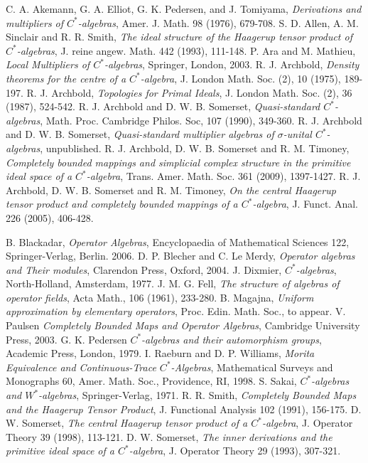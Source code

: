 \documentclass[]{amsart}
\theoremstyle{remark}
\theoremstyle{definition}
\theoremstyle{question}
\numberwithin{equation}{section}
\begin{document}
\begin{thebibliography}{99}

 C. A. Akemann, G. A. Elliot, G. K. Pedersen, and J. Tomiyama,
\emph{Derivations and multipliers of $C^*$-algebras}, Amer. J. Math. 98
 (1976), 679-708.
 S. D. Allen, A. M. Sinclair and R. R. Smith, \emph{The ideal
structure of the Haagerup tensor product of $C^*$-algebras}, J. reine angew.
Math. 442 (1993), 111-148.
 P. Ara and M. Mathieu, \emph{Local Multipliers of $C^*$-algebras},
Springer, London, 2003.
 R. J. Archbold, \emph{Density theorems for the centre of a
$C^*$-algebra}, J. London Math. Soc. (2), 10 (1975), 189-197.
 R. J. Archbold, \emph{Topologies for Primal Ideals}, J. London
Math. Soc. (2), 36 (1987), 524-542.
 R. J. Archbold and D. W. B. Somerset, \emph{Quasi-standard
$C^*$-algebras}, Math. Proc. Cambridge Philos. Soc, 107 (1990), 349-360.
 R. J. Archbold and D. W. B. Somerset, \emph{Quasi-standard
multiplier algebras of $\sigma$-unital $C^*$-algebras}, unpublished.
 R. J. Archbold, D. W. B. Somerset and R. M. Timoney,
\emph{Completely bounded mappings and simplicial complex structure in the
primitive ideal space of a $C^*$-algebra}, Trans. Amer. Math. Soc. 361 (2009),
1397-1427.
 R. J. Archbold, D. W. B. Somerset and R. M. Timoney, \emph{On the
central Haagerup tensor product and completely
               bounded mappings of a $C^*$-algebra}, J. Funct. Anal. 226 (2005),
406-428.

 B. Blackadar, \emph{Operator Algebras}, Encyclopaedia of Mathematical Sciences 122, Springer-Verlag, Berlin. 2006.
D. P. Blecher and C. Le Merdy, \emph{Operator algebras and Their modules},
Clarendon Press, Oxford, 2004.
 J. Dixmier, \emph{$C^*$-algebras}, North-Holland, Amsterdam, 1977.
 J. M. G. Fell, \emph{The structure of algebras of operator
fields}, Acta Math., 106 (1961), 233-280.
 B. Magajna, \emph{Uniform approximation by elementary operators},
Proc. Edin. Math. Soc., to appear.
 V. Paulsen \emph{Completely Bounded Maps and Operator Algebras}, Cambridge University Press, 2003.
  G. K. Pedersen \emph{$C^*$-algebras and their automorphism
groups}, Academic Press, London, 1979.
 I. Raeburn and D. P. Williams, \emph{Morita Equivalence and
Continuous-Trace $C^*$-Algebras}, Mathematical Surveys and Monographs 60, Amer.
Math. Soc., Providence, RI, 1998.
 S. Sakai, \emph{$C^*$-algebras and $W^*$-algebras},
Springer-Verlag, 1971.
 R. R. Smith, \emph{Completely Bounded Maps and the Haagerup Tensor
Product}, J. Functional Analysis 102 (1991), 156-175.
 D. W. Somerset, \emph{The central Haagerup tensor product of a
$C^*$-algebra}, J. Operator Theory 39 (1998), 113-121.
  D. W. Somerset, \emph{The inner derivations and the primitive
ideal space of a $C^*$-algebra}, J. Operator Theory 29 (1993), 307-321.
\end{thebibliography}
\end{document}
